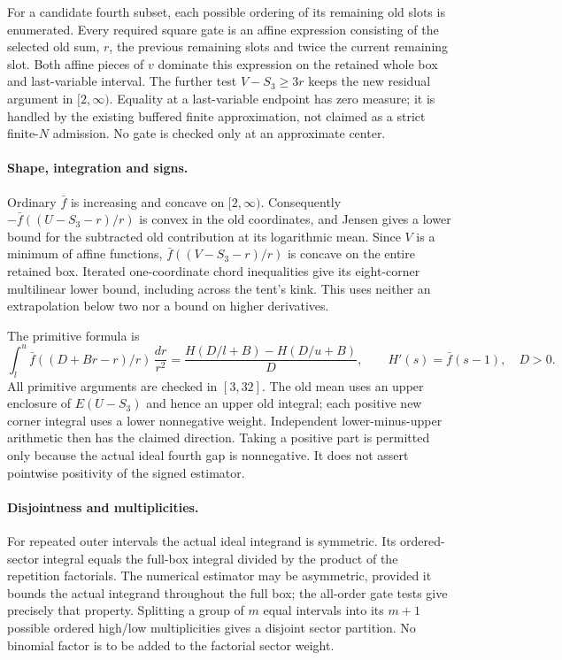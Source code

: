 For a candidate fourth subset, each possible ordering of its
remaining old slots is enumerated. Every required square gate is
an affine expression consisting of the selected old sum, $r$,
the previous remaining slots and twice the current remaining slot.
Both affine pieces of $v$ dominate this expression on the retained
whole box and last-variable interval. The further test
$V-S_3\ge3r$ keeps the new residual argument in $[2,\infty)$.
Equality at a last-variable endpoint has zero measure; it is
handled by the existing buffered finite approximation, not claimed
as a strict finite-$N$ admission. No gate is checked only at an
approximate center.

\paragraph{Shape, integration and signs.}
Ordinary $\bar f$ is increasing and concave on $[2,\infty)$.
Consequently $-\bar f((U-S_3-r)/r)$ is convex in the old
coordinates, and Jensen gives a lower bound for the subtracted
old contribution at its logarithmic mean. Since $V$ is a minimum
of affine functions, $\bar f((V-S_3-r)/r)$ is concave on the
entire retained box. Iterated one-coordinate chord inequalities
give its eight-corner multilinear lower bound, including across
the tent's kink. This uses neither an extrapolation below two
nor a bound on higher derivatives.

The primitive formula is
\[
 \int_l^u\bar f((D+Br-r)/r)\,\frac{dr}{r^2}
 =\frac{H(D/l+B)-H(D/u+B)}D,
 \qquad H'(s)=\bar f(s-1),\quad D>0.
\]
All primitive arguments are checked in $[3,32]$. The old mean
uses an upper enclosure of $E(U-S_3)$ and hence an upper old
integral; each positive new corner integral uses a lower
nonnegative weight. Independent lower-minus-upper arithmetic
then has the claimed direction. Taking a positive part is
permitted only because the actual ideal fourth gap is
nonnegative. It does not assert pointwise positivity of the
signed estimator.

\paragraph{Disjointness and multiplicities.}
For repeated outer intervals the actual ideal integrand is
symmetric. Its ordered-sector integral equals the full-box
integral divided by the product of the repetition factorials.
The numerical estimator may be asymmetric, provided it bounds
the actual integrand throughout the full box; the all-order
gate tests give precisely that property. Splitting a group of
$m$ equal intervals into its $m+1$ possible ordered high/low
multiplicities gives a disjoint sector partition. No binomial
factor is to be added to the factorial sector weight.

